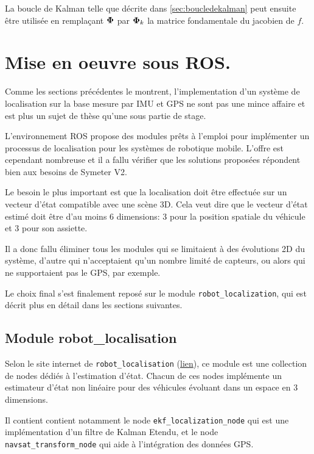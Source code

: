 \documentclass[12pt,a4paper]{report}
\begin{document}
	La boucle de Kalman telle que décrite dans \ref{sec:boucledekalman} peut ensuite être utilisée en remplaçant $\boldsymbol{\Phi}$ par $\boldsymbol{\Phi}_k$ la matrice fondamentale du jacobien de $f$.

	
	\section{Mise en oeuvre sous ROS.} Comme les sections précédentes le montrent, l'implementation d'un système de localisation sur la base mesure par IMU et GPS ne sont pas une mince affaire et est plus un sujet de thèse qu'une sous partie de stage. 
	
	\para L'environnement ROS propose des modules prêts à l'emploi pour implémenter un processus de localisation pour les systèmes de robotique mobile. L'offre est cependant nombreuse et il a fallu vérifier que les solutions proposées répondent bien aux besoins de Symeter V2.
	
	\para Le besoin le plus important est que la localisation doit être effectuée sur un vecteur d'état compatible avec une scène 3D. Cela veut dire que le vecteur d'état estimé doit être d'au moins 6 dimensions: 3 pour la position spatiale du véhicule et 3 pour son assiette.
	
	\para Il a donc fallu éliminer tous les modules qui se limitaient à des évolutions 2D du système, d'autre qui n'acceptaient qu'un nombre limité de capteurs, ou alors qui ne supportaient pas le GPS, par exemple.
	
	\para Le choix final s'est finalement reposé sur le module \verb|robot_localization|, qui est décrit plus en détail dans les sections suivantes.
	
	\subsection{Module robot\_localisation}
	Selon le site internet de \verb|robot_localisation| (\href{http://docs.ros.org/melodic/api/robot_localization/html/index.html}{lien}), ce module est une collection de nodes dédiés à l'estimation d'état. Chacun de ces nodes implémente un estimateur d'état non linéaire pour des véhicules évoluant dans un espace en 3 dimensions.
	
	\para Il contient contient notamment le node \verb|ekf_localization_node| qui est une implémentation d'un filtre de Kalman Etendu, et le node \verb|navsat_transform_node| qui aide à l'intégration des données GPS.
	
\end{document}
